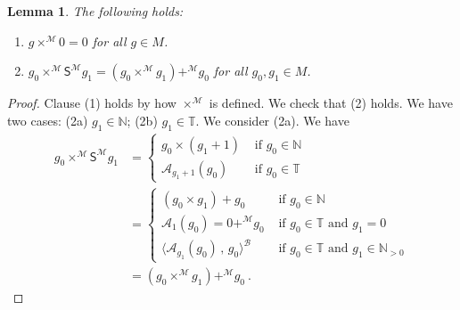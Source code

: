 \documentclass[10pt,a4paper, openany,  oldfontcommands]{memoir}
\newtheorem{lemma} [theorem] {Lemma}
\newtheorem{open problem} [theorem] {Open Problem}
\newtheorem{open question} [theorem] {Open Question}
\renewcommand{\mathrm}{\mathsf}
\begin{document}
\begin{lemma}
The following holds:
\begin{enumerate}
\item  $  g \times^{  \mathcal{M}  }   0  =  0  $  for all $  g \in  M  $. 

\item   $ g_0   \times^{  \mathcal{M}  }    \mathrm{S}^{ \mathcal{M}  }  g_1  =   \left( g_0 \times^{  \mathcal{M}  }   g_1  \right)   +^{  \mathcal{M}  }    g_0  $ 
for all $  g_0, g_1  \in M $.
\end{enumerate}
\end{lemma}
\begin{proof}

Clause (1) holds  by how   $  \times^{  \mathcal{M}  }    $  is defined. 
We check that (2) holds. 
We have two cases: 
(2a)  $  g_1  \in  \mathbb{N} $; 
(2b) $  g_1  \in  \mathbb{T} $.
We consider (2a). 
We have 
\begin{align*}
 g_0  \times^{  \mathcal{M}  }    \mathrm{S}^{ \mathcal{M}  }  g_1    
 &  =  \begin{cases}
 g_0  \times  (g_1+1)          &   \mbox{  if  }    g_0   \in  \mathbb{N}
 \\
 \mathcal{A}_{ g_1+1  }  \left(  g_0   \right)      &  \mbox{  if  }   g_0   \in  \mathbb{T}
 \end{cases}
 \\
 &  =  \begin{cases}
 \left(  g_0  \times  g_1   \right) + g_0           &   \mbox{  if  }    g_0   \in  \mathbb{N}
 \\
  \mathcal{A}_{ 1  }  \left(  g_0   \right)   = 0 +^{  \mathcal{M}  }  g_0           
                            &   \mbox{  if  }    g_0   \in  \mathbb{T}       \mbox{  and  }   g_1  =  0 
 \\
 \langle     \mathcal{A}_{ g_1  }  \left(  g_0   \right)   \,  ,   \,   g_0     \rangle^{   \mathcal{B}  }      
      &  \mbox{  if  }   g_0   \in  \mathbb{T}   \mbox{  and  }   g_1  \in  \mathbb{N}_{ > 0 }
 \end{cases} 
 \\
 & =   \left( g_0 \times^{  \mathcal{M}  }   g_1  \right)   +^{  \mathcal{M}  }    g_0 
 \     .
\end{align*}






\end{proof}
\end{document}
